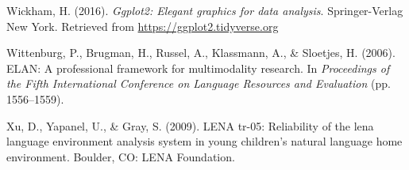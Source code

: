 \documentclass[,man,floatsintext]{apa6}
\begin{document}
\hypertarget{ref-R-ggplot2}{}
Wickham, H. (2016). \emph{Ggplot2: Elegant graphics for data analysis}.
Springer-Verlag New York. Retrieved from
\url{https://ggplot2.tidyverse.org}

\hypertarget{ref-ELAN}{}
Wittenburg, P., Brugman, H., Russel, A., Klassmann, A., \& Sloetjes, H.
(2006). ELAN: A professional framework for multimodality research. In
\emph{Proceedings of the Fifth International Conference on Language
Resources and Evaluation} (pp. 1556--1559).

\hypertarget{ref-xu2009reliability}{}
Xu, D., Yapanel, U., \& Gray, S. (2009). LENA tr-05: Reliability of the
lena language environment analysis system in young children's natural
language home environment. Boulder, CO: LENA Foundation.

\endgroup
\end{document}
